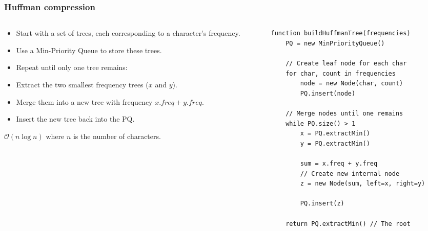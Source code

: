 \documentclass[8pt,aspectratio=169]{beamer}
\begin{document}
\begin{frame}[fragile]
\frametitle{Huffman compression}
\begin{columns}[T]
    \begin{column}{0.4\textwidth}
        \begin{itemize}
            \item Start with a set of trees, each corresponding to a character's frequency.
            \item Use a Min-Priority Queue to store these trees.
            \item Repeat until only one tree remains:
            \item Extract the two smallest frequency trees ($x$ and $y$).
            \item Merge them into a new tree with frequency $x.freq + y.freq$.
            \item Insert the new tree back into the PQ.
        \end{itemize}
        \vspace{1em}
        $\mathcal{O}(n \log n)$ where $n$ is the number of characters.
    \end{column}

    \begin{column}{0.58\textwidth}
    \begin{lstlisting}[basicstyle=\tiny\ttfamily, frame=single]
function buildHuffmanTree(frequencies)
    PQ = new MinPriorityQueue()
    
    // Create leaf node for each char
    for char, count in frequencies
        node = new Node(char, count)
        PQ.insert(node)

    // Merge nodes until one remains
    while PQ.size() > 1
        x = PQ.extractMin()
        y = PQ.extractMin()
        
        sum = x.freq + y.freq
        // Create new internal node
        z = new Node(sum, left=x, right=y)
   
        PQ.insert(z)

    return PQ.extractMin() // The root
    \end{lstlisting}
    \end{column}
\end{columns}
\end{frame}
\end{document}
